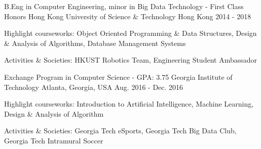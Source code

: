 

\begin{cventries}

  \cventry
    {B.Eng in Computer Engineering, minor in Big Data Technology - First Class Honors} %
    {Hong Kong University of Science \& Technology} %
    {Hong Kong} %
    {2014 - 2018} %
    {
      \begin{cvitems} %
        \item Highlight courseworks: Object Oriented Programming \& Data Structures, Design \& Analysis of Algorithms, Database Management Systems
        \item Activities \& Societies: HKUST Robotics Team, Engineering Student Ambassador
      \end{cvitems}
    }
   \cventry
    {Exchange Program in Computer Science - GPA: 3.75} %
    {Georgia Institute of Technology} %
    {Atlanta, Georgia, USA} %
    {Aug. 2016 - Dec. 2016} %
    {
      \begin{cvitems} %
        \item Highlight courseworks: Introduction to Artificial Intelligence, Machine Learning, Design \& Analysis of Algorithm
        \item Activities \& Societies: Georgia Tech eSports, Georgia Tech Big Data Club, Georgia Tech Intramural Soccer
      \end{cvitems}
    }

\end{cventries}
